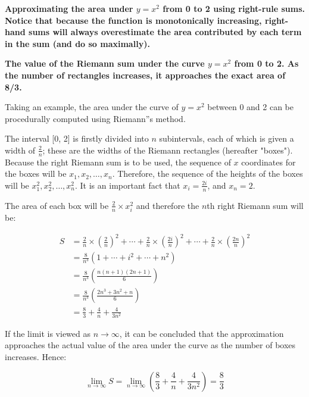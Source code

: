 
\textbf{Approximating the area under $y=x^2$ from 0 to 2 using right-rule sums. Notice that because the function is monotonically increasing, right-hand sums will always overestimate the area contributed by each term in the sum (and do so maximally).}




\textbf{The value of the Riemann sum under the curve $y = x^2$ from 0 to 2. As the number of rectangles increases, it approaches the exact area of 8/3.}



Taking an example, the area under the curve of $y = x^2$ between 0 and 2 can be procedurally computed using Riemann''s method.



The interval [0, 2] is firstly divided into $n$ subintervals, each of which is given a width of $\frac{2}{n}$; these are the widths of the Riemann rectangles (hereafter "boxes"). Because the right Riemann sum is to be used, the sequence of $x$ coordinates for the boxes will be $x_1, x_2, \ldots, x_n$. Therefore, the sequence of the heights of the boxes will be $x_1^2, x_2^2, \ldots, x_n^2$. It is an important fact that $x_i = \frac{2i}{n}$, and $x_n = 2$.



The area of each box will be $\frac{2}{n} \times x_i^2$ and therefore the $n$th right Riemann sum will be:

\begin{align}
S &= \frac{2}{n} \times \left(\frac{2}{n}\right)^2 + \cdots + \frac{2}{n} \times \left(\frac{2i}{n}\right)^2 + \cdots + \frac{2}{n} \times \left(\frac{2n}{n}\right)^2 \\\  &= \frac{8}{n^3} \left(1 + \cdots + i^2 + \cdots + n^2\right) \\\  &= \frac{8}{n^3} \left(\frac{n(n+1)(2n+1)}{6}\right) \\\  &= \frac{8}{n^3} \left(\frac{2n^3 + 3n^2 + n}{6}\right) \\\  &= \frac{8}{3} + \frac{4}{n} + \frac{4}{3n^2}
\end{align}

If the limit is viewed as $n \to \infty$, it can be concluded that the approximation approaches the actual value of the area under the curve as the number of boxes increases. Hence:



$$\lim_{n \to \infty} S = \lim_{n \to \infty}\left(\frac{8}{3} + \frac{4}{n} + \frac{4}{3n^2}\right) = \frac{8}{3}$$



